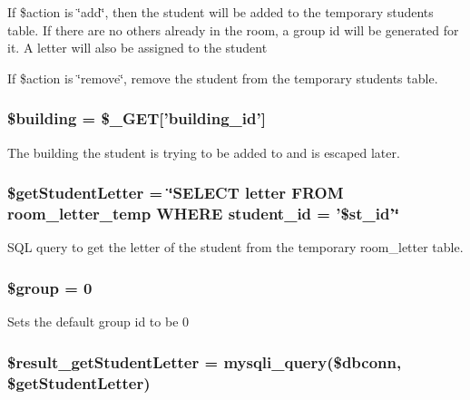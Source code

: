 \-If \$action is \char`\"{}add\char`\"{}, then the student will be added to the temporary students table. \-If there are no others already in the room, a group id will be generated for it. \-A letter will also be assigned to the student

\-If \$action is \char`\"{}remove\char`\"{}, remove the student from the temporary students table. \hypertarget{updateStudentTableDB_8php_a903ab1c50249715a442ce81e6d5ba775}{
\subsubsection[{\$building}]{\setlength{\rightskip}{0pt plus 5cm}\$building = \$\-\_\-\-G\-E\-T\mbox{[}'building\-\_\-id'\mbox{]}}}\label{updateStudentTableDB_8php_a903ab1c50249715a442ce81e6d5ba775}
\-The building the student is trying to be added to and is escaped later. \hypertarget{updateStudentTableDB_8php_af06279fba2b6159d32d26bae1bd62aee}{
\subsubsection[{\$get\-Student\-Letter}]{\setlength{\rightskip}{0pt plus 5cm}\$get\-Student\-Letter = \char`\"{}\-S\-E\-L\-E\-C\-T letter \-F\-R\-O\-M room\-\_\-letter\-\_\-temp \-W\-H\-E\-R\-E student\-\_\-id = '\$st\-\_\-id'\char`\"{}}}\label{updateStudentTableDB_8php_af06279fba2b6159d32d26bae1bd62aee}
\-S\-Q\-L query to get the letter of the student from the temporary room\-\_\-letter table. \hypertarget{updateStudentTableDB_8php_ad530a85733b0ec1dc321859fd8faa0dc}{
\subsubsection[{\$group}]{\setlength{\rightskip}{0pt plus 5cm}\$group = 0}}\label{updateStudentTableDB_8php_ad530a85733b0ec1dc321859fd8faa0dc}
\-Sets the default group id to be 0 \hypertarget{updateStudentTableDB_8php_a570754c64bbdb4096bb2ee09f899cfb8}{
\subsubsection[{\$result\-\_\-get\-Student\-Letter}]{\setlength{\rightskip}{0pt plus 5cm}\$result\-\_\-get\-Student\-Letter = mysqli\-\_\-query(\$dbconn, \$get\-Student\-Letter)}}\label{updateStudentTableDB_8php_a570754c64bbdb4096bb2ee09f899cfb8}
